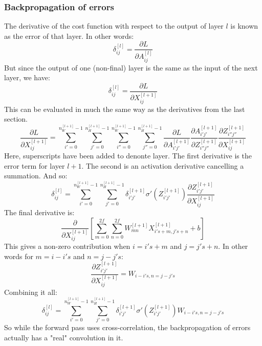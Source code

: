 \documentclass[12pt, a4paper]{article}
\numberwithin{equation}{section}
\begin{document}
\subsubsection{Backpropagation of errors}
The derivative of the cost function with respect to the output of layer $l$ is known as the error of that layer. In other words:
\begin{equation}
\delta^{[l]}_{ij}=\frac{\partial L}{\partial A^{[l]}_{ij}}
\end{equation}
But since the output of one (non-final) layer is the same as the input of the next layer, we have:
\begin{equation}
\delta^{[l]}_{ij}=\frac{\partial L}{\partial X^{[l+1]}_{ij}}
\end{equation}
This can be evaluated in much the same way as the derivatives from the last section.
\begin{equation}
\frac{\partial L}{\partial X^{[l+1]}_{ij}}=\sum_{i'=0}^{n^{[l+1]}_W-1}\sum_{j'=0}^{n^{[l+1]}_H-1}\sum_{i''=0}^{n^{[l+1]}_W-1}\sum_{j''=0}^{n^{[l+1]}_H-1}\frac{\partial L}{\partial A^{[l+1]}_{i'j'}}\frac{\partial A^{[l+1]}_{i'j'}}{\partial Z^{[l+1]}_{i''j''}}\frac{\partial Z^{[l+1]}_{i''j''}}{\partial X^{[l+1]}_{ij}}
\end{equation}
Here, superscripts have been added to denonte layer. The first derivative is the error term for layer $l+1$. The second is an activation derivative cancelling a summation. And so:
\begin{equation}
\delta^{[l]}_{ij}=\sum_{i'=0}^{n^{[l+1]}_W-1}\sum_{j'=0}^{n^{[l+1]}_H-1}\delta^{[l+1]}_{i'j'}\sigma'\left(Z^{[l+1]}_{i'j'}\right)\frac{\partial Z^{[l+1]}_{i'j'}}{\partial X^{[l+1]}_{ij}}
\end{equation}
The final derivative is:
\begin{equation}
\frac{\partial}{\partial X^{[l+1]}_{ij}}\left[\sum_{m=0}^{2f}\sum_{n=0}^{2f}W^{[l+1]}_{mn}X^{[l+1]}_{i's+m,j's+n}+b\right]
\end{equation}
This gives a non-zero contribution when $i=i's+m$ and $j=j's+n$. In other words for $m=i-i's$ and $n=j-j's$:
\begin{equation}
\frac{\partial Z^{[l+1]}_{i'j'}}{\partial X^{[l+1]}_{ij}}=W_{i-i's,n=j-j's}
\end{equation}
Combining it all:
\begin{equation}
\delta^{[l]}_{ij}=\sum_{i'=0}^{n^{[l+1]}_W-1}\sum_{j'=0}^{n^{[l+1]}_H-1}\delta^{[l+1]}_{i'j'}\sigma'\left(Z^{[l+1]}_{i'j'}\right)W_{i-i's,n=j-j's}
\end{equation}
So while the forward pass uses cross-correlation, the backpropagation of errors actually has a "real" convolution in it.
\end{document}
